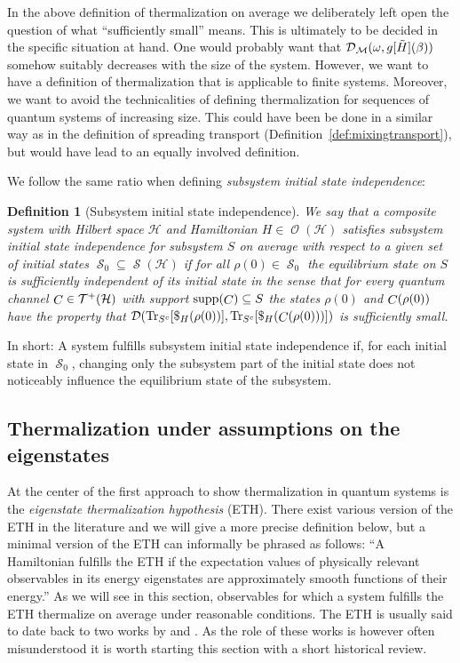 \documentclass[a4paper,12pt,listof=totoc,index=totoc,bibliography=totoc,headsepline=false,headings=normal,BCOR16.153846mm,DIV12,headinclude,twoside,cleardoublepage=empty,numbers=noenddot,final]{scrreprt}
\theoremstyle{mystyle}
\numberwithin{equation}{section}
\numberwithin{figure}{section}
\numberwithin{lemma}{section}
\numberwithin{theorem}{section}
\numberwithin{corollary}{section}
\newtheorem{definition}{Definition}
\numberwithin{definition}{section}
\numberwithin{conjecture}{section}
\numberwithin{observation}{section}
\newcommand{\+}{\mkern2mu}
\renewcommand{\H}{H}
\newcommand{\rhog}{g}
\newcommand{\tracedistance}[3][]{
  \ifthenelse{\equal{#2}{}}
  {\ifthenelse{\equal{#3}{}}
    {\mathcal{D}_{#1}}{}
  }{
    \ifthenelse{\equal{#1}{}}
    {\operatorname{\mathcal{D}}(#2,#3)}
    {\operatorname{\mathcal{D}}_{#1}(#2,#3)}
  }
}
\newcommand{\compl}[1]{{{#1}^c}}
\DeclareMathOperator{\1}{\mathds{1}}
\newcommand{\POVMs}{\mathcal{M}}
\DeclareMathOperator{\Obs}{\mathcal{O}}
\DeclareMathOperator{\Qst}{\mathcal{S}}
\DeclareMathOperator{\Qch}{\mathcal{T^+}}
\DeclareMathOperator{\Chann}{\mathnormal{C}}
\DeclareMathOperator{\Tr}{Tr}
\DeclareMathOperator{\supp}{supp}
\newcommand{\mc}[1]{\mathcal{#1}}
\newcommand{\mcH}{\mc{H}}
\begin{document}
In the above definition of thermalization on average we deliberately left open the question of what ``sufficiently small'' means.
This is ultimately to be decided in the specific situation at hand.
One would probably want that $\tracedistance[\POVMs]{\omega}{\rhog[\tilde H](\beta)}$ somehow suitably decreases with the size of the system.
However, we want to have a definition of thermalization that is applicable to finite systems.
Moreover, we want to avoid the technicalities of defining thermalization for sequences of quantum systems of increasing size.
This could have been be done in a similar way as in the definition of spreading transport (Definition~\ref{def:mixingtransport}), but would have lead to an equally involved definition.

We follow the same ratio when defining \emph{subsystem initial state independence}:
\begin{definition}[Subsystem initial state independence] \label{def:subsysteminitialstateindependence}
  We say that a composite system with Hilbert space $\mcH$ and Hamiltonian $\H \in \Obs(\mcH)$ satisfies \emph{subsystem initial state independence} for subsystem $S$ on average with respect to a given set of initial states $\Qst_0 \subseteq \Qst(\mcH)$ if for all $\rho(0) \in \Qst_0$ the equilibrium state on $S$ is sufficiently independent of its initial state in the sense that for every quantum channel $\Chann \in\Qch(\mcH)$ with support $\supp(\Chann) \subseteq S$ the states $\rho(0)$ and $\Chann(\rho(0))$ have the property that $\tracedistance{\Tr_{\compl{S}}[\$_\H(\rho(0))]}{\Tr_{\compl{S}}[\$_\H(\Chann(\rho(0)))]}$ is sufficiently small.
\end{definition}
In short: A system fulfills subsystem initial state independence if, for each initial state in $\Qst_0$, changing only the subsystem part of the initial state does not noticeably influence the equilibrium state of the subsystem.


\subsection{Thermalization under assumptions on the eigenstates}
\label{sec:thermalizationunderassumptionsontheeigenstates}
%
At the center of the first approach to show thermalization in quantum systems is the \emph{eigenstate thermalization hypothesis} (ETH).
There exist various version of the ETH in the literature and we will give a more precise definition below, but a minimal version of the ETH can informally be phrased as follows: ``A Hamiltonian fulfills the ETH if the expectation values of physically relevant observables in its energy eigenstates are approximately smooth functions of their energy.''
As we will see in this section, observables for which a system fulfills the ETH thermalize on average under reasonable conditions.
The ETH is usually said to date back to two works by \textcite{PhysRevA.43.20} and \textcite{PhysRevE.50.88}.
As the role of these works is however often misunderstood it is worth starting this section with a short historical review.
\end{document}
